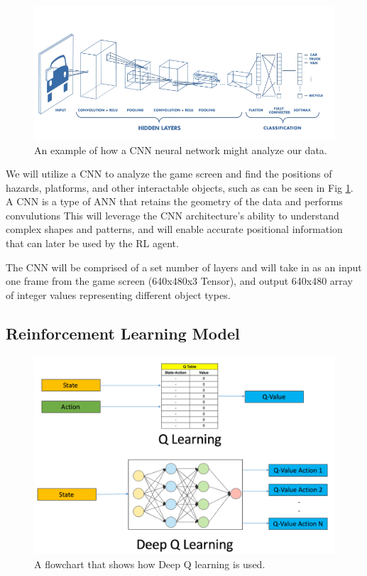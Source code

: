 \documentclass{article} %
\begin{document}
\begin{figure}[!htbp]
\begin{center}
\includegraphics[width=1.0\textwidth]{Figs/CNN_sample_structure.png}
\end{center}
\caption{An example of how a CNN neural network might analyze our data.}
\label{fig:CNN_neural_network}
\end{figure}

We will utilize a CNN to analyze the game screen and find the positions of hazards, platforms, and other interactable objects, such as can be seen in Fig \ref{fig:CNN_neural_network}. A CNN is a type of ANN that retains the geometry of the data and performs convulutions  This will leverage the CNN architecture’s ability to understand complex shapes and patterns, and will enable accurate positional information that can later be used by the RL agent.

The CNN will be comprised of a set number of layers and will take in as an
input one frame from the game screen (640x480x3 Tensor), and output 
640x480 array of integer values representing different object types.
 

\subsection*{Reinforcement Learning Model}

\begin{figure}[!htbp]
\begin{center}
\includegraphics[width=1.0\textwidth]{Figs/QLearn_img.png}
\end{center}
\caption{A flowchart that shows how Deep Q learning is used.}
\label{fig:Deep_Q_Learn}
\end{figure}
\end{document}
